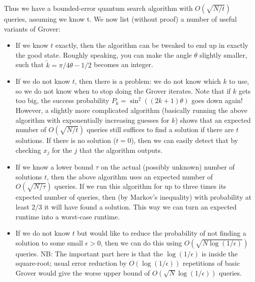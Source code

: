 \documentclass[12pt,oneside]{amsart}
\theoremstyle{plain}%
\theoremstyle{definition}
\theoremstyle{remark}
\begin{document}
Thus we have a bounded-error quantum search algorithm with $O(\sqrt{N/t})$ queries, assuming we
know t. We now list (without proof) a number of useful variants of Grover:
\begin{itemize}
  \item If we know $t$ exactly, then the algorithm can be tweaked to end up in exactly the good state.
Roughly speaking, you can make the angle $\theta$ slightly smaller, such that $\widetilde{k} = \pi/4\theta − 1/2$
becomes an integer.
  \item If we do not know $t$, then there is a problem: we do not know which $k$ to use, so we do
not know when to stop doing the Grover iterates. Note that if $k$ gets too big, the success
probability $P_k = \sin^2((2k + 1)\theta)$ goes down again! However, a slightly more complicated
algorithm (basically running the above algorithm with exponentially increasing guesses for $k$) shows that an expected number of $O(\sqrt{N/t})$ queries still suffices to find a solution if there are $t$ solutions. If there is no solution ($t = 0$), then we can easily detect that by checking $x_j$ for the $j$ that the algorithm outputs.
  \item If we know a lower bound $\tau$ on the actual (possibly unknown) number of solutions $t$, then the
above algorithm uses an expected number of $O(\sqrt{N/\tau})$ queries. If we run this algorithm for up to three times its expected number of queries, then (by Markov’s inequality) with probability at least $2/3$ it will have found a solution. This way we can turn an expected runtime into a worst-case runtime.
  \item If we do not know $t$ but would like to reduce the probability of not finding a solution to some
small $\epsilon >0$, then we can do this using $O(\sqrt{N \log(1/\epsilon)})$ queries. NB: The important part here is that the $\log(1/\epsilon)$ is inside the square-root; usual error reduction by $O(\log(1/\epsilon))$ repetitions of basic Grover would give the worse upper bound of $O(\sqrt{N} \log(1/\epsilon))$ queries.
\end{itemize}
\end{document}

